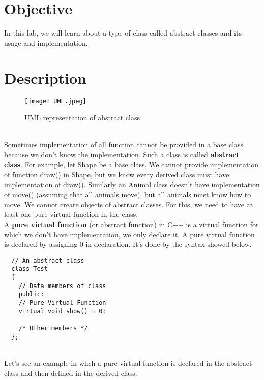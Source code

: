 \documentclass[11pt,fleqn]{book} %
\begin{document}
\section{Objective}
In this lab, we will learn about a type of class called abstract classes and its usage and implementation.
\section{Description}
\begin{figure}[h]
  \centering
  \texttt{[image: UML.jpeg]}
  \caption{UML representation of abstract class}
\end{figure} ~\\
Sometimes implementation of all function cannot be provided in a base class because we don’t know the implementation. Such a class is called \textbf{abstract class}. For example, let Shape be a base class. We cannot provide implementation of function draw() in Shape, but we know every derived class must have implementation of draw(). Similarly an Animal class doesn’t have implementation of move() (assuming that all animals move), but all animals must know how to move. We cannot create objects of abstract classes. For this, we need to have at least one pure virtual function in the class. \\
A \textbf{pure virtual function} (or abstract function) in C++ is a virtual function for which we don’t have implementation, we only declare it. A pure virtual function is declared by assigning 0 in declaration. It's done by the syntax showed below.
\begin{lstlisting}
  // An abstract class
  class Test
  {   
    // Data members of class
    public:
    // Pure Virtual Function
    virtual void show() = 0;

    /* Other members */
  };
\end{lstlisting} ~\\
Let's see an example in whch a pure virtual function is declared in the abstract class and then defined in the derived class.
\end{document}
